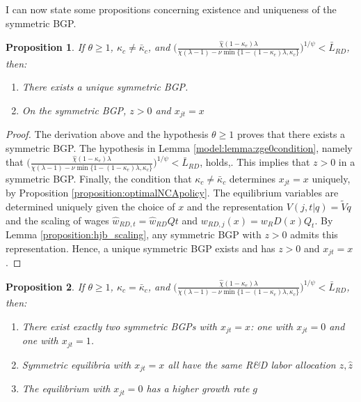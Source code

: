 \documentclass[11pt,english]{article}
\newtheorem{proposition}{Proposition}
\begin{document}
I can now state some propositions concerning existence and uniqueness of the symmetric BGP. 

\begin{proposition}\label{proposition:purstrategyeq:positiveOI}
	If $\theta \ge 1$, $\kappa_c \ne \bar{\kappa}_c$, and $\Big( \frac{\hat{\chi} (1-\kappa_{e}) \lambda}{\chi(\lambda-1) - \nu \min\{ 1-(1-\kappa_e) \lambda, \kappa_c \}} \Big)^{1/\psi} < \bar{L}_{RD}$, then:
	\begin{enumerate}
		\item There exists a unique symmetric BGP.
		\item On the symmetric BGP, $z > 0$ and $x_{jt} = x$
	\end{enumerate}
\end{proposition}

\begin{proof}
	The derivation above and the hypothesis $\theta \ge 1$ proves that there exists a symmetric BGP. The hypothesis in Lemma \ref{model:lemma:zge0condition}, namely that $\Big( \frac{\hat{\chi} (1-\kappa_{e}) \lambda}{\chi(\lambda-1) - \nu \min\{ 1-(1-\kappa_e) \lambda, \kappa_c \}} \Big)^{1/\psi} < \bar{L}_{RD}$, holds,. This implies that $z > 0$ in a symmetric BGP. Finally, the condition that $\kappa_c \ne \bar{\kappa}_c$ determines $x_{jt} = x$ uniquely, by Proposition \ref{proposition:optimalNCApolicy}. The equilibrium variables are determined uniquely given the choice of $x$ and the representation $V(j,t|q) = \tilde{V}q$ and the scaling of wages $\hat{w}_{RD,t} = \hat{w}_{RD}Qt$ and $w_{RD,j}(x) = w_RD(x) Q_t$. By Lemma \ref{proposition:hjb_scaling}, any symmetric BGP with $z > 0$ admits this representation. Hence, a unique symmetric BGP exists and has $z > 0$ and $x_{jt} = x$. 
\end{proof}

\begin{proposition}\label{proposition:purestrategyeq:incumbents_indifferent}
	If $\theta \ge 1$, $\kappa_c = \bar{\kappa}_c$, and $\Big( \frac{\hat{\chi} (1-\kappa_{e}) \lambda}{\chi(\lambda-1) - \nu \min\{ 1-(1-\kappa_e) \lambda, \kappa_c \}} \Big)^{1/\psi} < \bar{L}_{RD}$, then:
	\begin{enumerate}
		\item There exist exactly two symmetric BGPs with $x_{jt} = x$: one with $x_{jt} = 0$ and one with $x_{jt} = 1$.
		\item Symmetric equilibria with $x_{jt} = x$ all have the same R\&D labor allocation $z, \hat{z}$
		\item The equilibrium with $x_{jt} = 0$ has a higher growth rate $g$ 
	\end{enumerate} 
\end{proposition}
\end{document}

